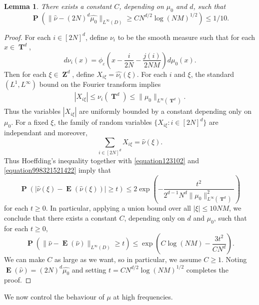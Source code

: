 \documentclass[12pt,reqno]{article}
\DeclareMathOperator{\ZZ}{\mathbf{Z}}
\DeclareMathOperator{\TT}{\mathbf{T}}
\newtheorem{lemma}[theorem]{Lemma}
\DeclareMathOperator{\EE}{\mathbf{E}}
\DeclareMathOperator{\PP}{\mathbf{P}}
\begin{document}
\begin{lemma}
    There exists a constant $C$, depending on $\mu_0$ and $d$, such that
    \[ \PP \left( \| \widehat{\nu} - (2N)^d \widehat{\mu_0} \|_{L^\infty(D)} \geq C N^{d/2} \log(NM)^{1/2} \right) \leq 1/10. \]
\end{lemma}
\begin{proof}
    For each $i \in [2N]^d$, define $\nu_i$ to be the smooth measure such that for each $x \in \TT^d$,
    \[ d\nu_i(x) = \phi_\varepsilon \left( x - \frac{i}{2N} - \frac{j(i)}{2NM} \right) d\mu_0(x). \]
    Then for each $\xi \in \ZZ^d$, define $X_{i \xi} = \widehat{\nu_i}(\xi)$. For each $i$ and $\xi$, the standard $(L^1,L^\infty)$ bound on the Fourier transform implies
    \begin{equation} \label{equation123102}
    \begin{split}
        |X_{i\xi}| \leq \nu_i(\TT^d) \leq \| \mu_0 \|_{L^\infty(\TT^d)}.
    \end{split}
    \end{equation}
    Thus the variables $|X_{i \xi}|$ are uniformly bounded by a constant depending only on $\mu_0$. For a fixed $\xi$, the family of random variables $\{ X_{i \xi} : i \in [2N]^d \}$ are independant and moreover,
    \begin{equation} \label{equation998321521422}
        \sum_{i \in [2N]^d} X_{i \xi} = \widehat{\nu}(\xi).
    \end{equation}
    Thus Hoeffding's inequality together with \eqref{equation123102} and \eqref{equation998321521422} imply that
    \[ \PP \left( \left| \widehat{\nu}(\xi) - \EE(\widehat{\nu}(\xi)) \right| \geq t \right) \leq 2 \exp \left( - \frac{t^2}{2^{d-1} N^{d} \| \mu_0 \|_{L^\infty(\TT^d)}^2} \right) \]
    for each $t \geq 0$. In particular, applying a union bound over all $|\xi| \leq 10 NM$, we conclude that there exists a constant $C$, depending only on $d$ and $\mu_0$, such that for each $t \geq 0$,
    \[ \PP \left( \| \widehat{\nu} - \EE(\widehat{\nu}) \|_{L^\infty(D)} \geq t \right) \leq \exp \left( C \log(NM) - \frac{3 t^2}{C N^d} \right). \]
    We can make $C$ as large as we want, so in particular, we assume $C \geq 1$. Noting $\EE(\widehat{\nu}) = (2N)^d \widehat{\mu_0}$ and setting $t = C N^{d/2} \log(NM)^{1/2}$ completes the proof.
\end{proof}

We now control the behaviour of $\mu$ at high frequencies.
\end{document}
